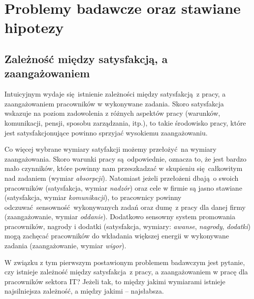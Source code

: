\section{Problemy badawcze oraz stawiane hipotezy}
\subsection{Zależność między satysfakcją, a zaangażowaniem}
\label{sec:hypothesis-relation}
Intuicyjnym wydaje się istnienie zależności między satysfakcją z pracy, a zaangażowaniem pracowników w wykonywane zadania. Skoro satysfakcja wskazuje na poziom zadowolenia z różnych aspektów pracy (warunków, komunikacji, pensji, sposobu zarządzania, itp.), to takie środowisko pracy, które jest satysfakcjonujące powinno sprzyjać wysokiemu zaangażowaniu. 

Co więcej wybrane wymiary satyfakcji możemy przełożyć na wymiary zaangażowania. Skoro warunki pracy są odpowiednie, oznacza to, że jest bardzo mało czynników, które powinny nam przeszkadzać w skupieniu
się całkowitym nad zadaniem (wymiar \textit{absorpcji}). Natomiast jeżeli przełożeni dbają o swoich pracowników (satysfakcja, wymiar \textit{nadzór}) oraz cele w firmie są jasno stawiane (satysfakcja, wymiar \textit{komunikacji}), to pracownicy powinny odczuwać sensowność wykonywanych zadań oraz dumę z pracy dla danej firmy (zaangażowanie, wymiar \textit{oddanie}). Dodatkowo sensowny system promowania pracowników, nagrody i dodatki (satysfakcja, wymiary: \textit{awanse},
\textit{nagrody}, \textit{dodatki}) mogą zachęcać pracowników do wkładania większej energii w wykonywane zadania (zaangażowanie, wymiar \textit{wigor}).

W związku z tym pierwszym postawionym problemem badawczym jest pytanie, czy istnieje zależność między satysfakcja z pracy, a zaangażowaniem w pracę dla pracowników sektora IT? Jeżeli tak, to między jakimi wymiarami istnieje najsilniejsza zależność, a między jakimi -- najsłabsza.

